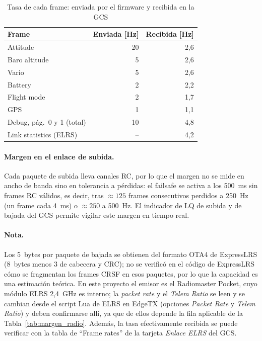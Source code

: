 \documentclass[12pt, letterpaper]{report}
\begin{document}
\begin{table}[htbp]
\centering
\caption{Tasa de cada frame: enviada por el firmware y recibida en la GCS}
\label{tab:tasas_medidas}
\renewcommand{\arraystretch}{1.25}
\small
\begin{tabular}{@{}l r r@{}}
\toprule
\rowcolor{gray!20}
\textbf{Frame} & \textbf{Enviada [Hz]} & \textbf{Recibida [Hz]} \\
\midrule
Attitude & 20 & 2,6 \\
Baro altitude & 5 & 2,6 \\
Vario & 5 & 2,6 \\
Battery & 2 & 2,2 \\
Flight mode & 2 & 1,7 \\
GPS & 1 & 1,1 \\
Debug, pág.~0 y 1 (total) & 10 & 4,8 \\
Link statistics (ELRS) & -- & 4,2 \\
\bottomrule
\end{tabular}
\end{table}

\paragraph{Margen en el enlace de subida.} Cada paquete de subida lleva canales RC, por lo que el margen no se mide en ancho de banda sino en tolerancia a pérdidas: el failsafe se activa a los 500~ms sin frames RC válidos, es decir, tras $\approx 125$ frames consecutivos perdidos a 250~Hz (un frame cada 4~ms) o $\approx 250$ a 500~Hz. El indicador de LQ de subida y de bajada del GCS permite vigilar este margen en tiempo real.

\paragraph{Nota.} Los 5~bytes por paquete de bajada se obtienen del formato OTA4 de ExpressLRS (8~bytes menos 3 de cabecera y CRC); no se verificó en el código de ExpressLRS cómo se fragmentan los frames CRSF en esos paquetes, por lo que la capacidad es una estimación teórica. En este proyecto el emisor es el Radiomaster Pocket, cuyo módulo ELRS 2,4~GHz es interno; la \textit{packet rate} y el \textit{Telem Ratio} se leen y se cambian desde el script Lua de ELRS en EdgeTX (opciones \textit{Packet Rate} y \textit{Telem Ratio}) y deben confirmarse allí, ya que de ellos depende la fila aplicable de la Tabla~\ref{tab:margen_radio}. Además, la tasa efectivamente recibida se puede verificar con la tabla de ``Frame rates'' de la tarjeta \textit{Enlace ELRS} del GCS.
\end{document}
